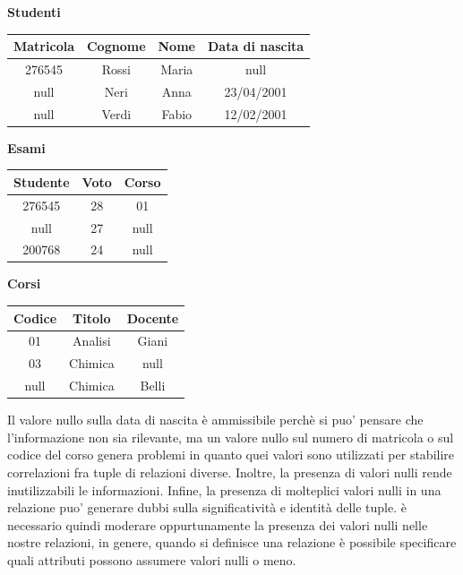 \documentclass[12pt]{report}
\begin{document}
	\begin{center}

		\textbf{Studenti}

		\vspace{0.5cm}

		\begin{tabular}{|c|c|c|c|}
			\hline
			\textbf{Matricola} & \textbf{Cognome} & \textbf{Nome} & \textbf{Data di nascita} \\
			\hline
			276545 & Rossi & Maria & null \\
			null & Neri & Anna & 23/04/2001 \\
			null & Verdi & Fabio & 12/02/2001 \\
			\hline
		\end{tabular}

		\vspace{1.5cm}

		\begin{minipage}[t]{0.45\textwidth}
			\centering
			\textbf{Esami}

			\vspace{0.5cm}

			\begin{tabular}{|c|c|c|}
				\hline
				\textbf{Studente} & \textbf{Voto} & \textbf{Corso} \\
				\hline
				276545 & 28 & 01 \\
				null & 27 & null \\
				200768 & 24 & null \\
				\hline
			\end{tabular}
		\end{minipage}
		\hfill
		\begin{minipage}[t]{0.45\textwidth}
			\centering
			\textbf{Corsi}

			\vspace{0.5cm}

			\begin{tabular}{|c|c|c|}
				\hline
				\textbf{Codice} & \textbf{Titolo} & \textbf{Docente} \\
				\hline
				01 & Analisi & Giani \\
				03 & Chimica & null \\
				null & Chimica & Belli \\
				\hline
			\end{tabular}
		\end{minipage}

	\end{center}
	Il valore nullo sulla data di nascita è ammissibile perchè si puo' pensare che l'informazione non sia rilevante, ma un valore nullo sul numero di matricola o sul codice del corso genera problemi in quanto quei valori sono utilizzati per stabilire correlazioni fra tuple di relazioni diverse. Inoltre, la presenza di valori nulli rende inutilizzabili le informazioni. Infine, la presenza di molteplici valori nulli in una relazione puo' generare dubbi sulla significatività e identità delle tuple. è necessario quindi moderare oppurtunamente la presenza dei valori nulli nelle nostre relazioni, in genere, quando si definisce una relazione è possibile specificare quali attributi possono assumere valori nulli o meno. \\
\end{document}
